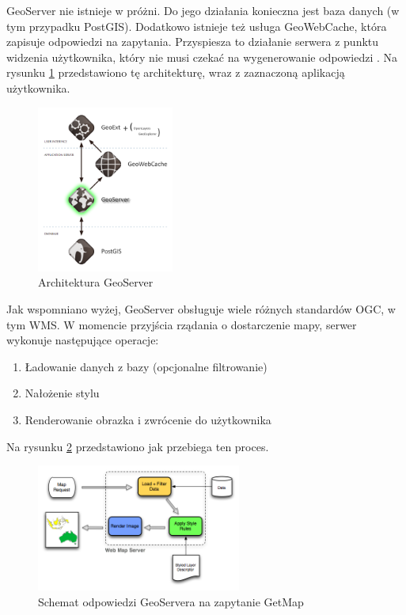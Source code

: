 GeoServer nie istnieje w próżni. Do jego działania konieczna jest baza danych (w tym przypadku PostGIS). Dodatkowo istnieje też usługa
GeoWebCache, która zapisuje odpowiedzi na zapytania. Przyspiesza to działanie serwera z punktu widzenia użytkownika, który nie musi
czekać na wygenerowanie odpowiedzi \cite{OpenGeo2012}. Na rysunku \ref{fig:GeoServerArchitecture} przedstawiono tę architekturę, wraz z zaznaczoną
aplikacją użytkownika.

\begin{figure}[h!]
    \centering
    \includegraphics[width=0.4\textwidth]{img/geoserver_architecture.png}
    \caption{Architektura GeoServer}
    \label{fig:GeoServerArchitecture}
\end{figure}

Jak wspomniano wyżej, GeoServer obsługuje wiele różnych standardów OGC, w tym WMS. W momencie przyjścia rządania o dostarczenie mapy,
serwer wykonuje następujące operacje:
\begin{enumerate}
    \item Ładowanie danych z bazy (opcjonalne filtrowanie)
    \item Nałożenie stylu
    \item Renderowanie obrazka i zwrócenie do użytkownika
\end{enumerate}
Na rysunku \ref{fig:geoserver_WMS_architecture} przedstawiono jak przebiega ten proces.

\begin{figure}[h!]
    \centering
    \includegraphics[width=0.6\textwidth]{img/geoserver_wms_architecture.png}
    \caption{Schemat odpowiedzi GeoServera na zapytanie GetMap}
    \label{fig:geoserver_WMS_architecture}
\end{figure}

